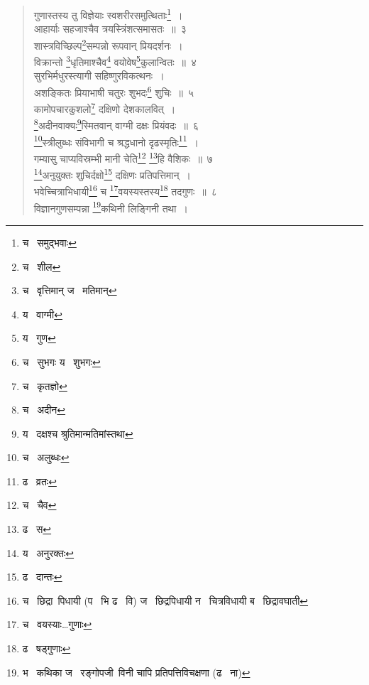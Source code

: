 \documentclass[11pt, openany]{book}
\begin{document}
\begin{quote}
{\na गुणास्तस्य तु विज्ञेयाः स्वशरीरसमुत्थिताः\renewcommand{\thefootnote}{1}\footnote{च \textendash\  समुद्भवाः}~।\\
आहार्याः सहजाश्चैव त्रयस्त्रिंशत्समासतः~॥~३\\
शास्त्रविच्छिल्प\renewcommand{\thefootnote}{2}\footnote{च \textendash\  शील}सम्पन्नो रूपवान् प्रियदर्शनः~।\\
विक्रान्तो \renewcommand{\thefootnote}{3}\footnote{च \textendash\  वृत्तिमान् ज \textendash\  मतिमान्}धृतिमाश्चैव\renewcommand{\thefootnote}{4}\footnote{य \textendash\  वाग्मी} वयोवेष\renewcommand{\thefootnote}{5}\footnote{य \textendash\  गुण}कुलान्वितः~॥~४\\
सुरभिर्मधुरस्त्यागी सहिष्णुरविकत्थनः~।\\
अशङ्कितः प्रियाभाषी चतुरः शुभदः\renewcommand{\thefootnote}{6}\footnote{च \textendash\  सुभगः य \textendash\  शुभगः} शुचिः~॥~५\\
कामोपचारकुशलो\renewcommand{\thefootnote}{7}\footnote{च \textendash\  कृतज्ञो} दक्षिणो देशकालवित्~।\\
\renewcommand{\thefootnote}{8}\footnote{च \textendash\  अदीन}अदीनवाक्यः\renewcommand{\thefootnote}{9}\footnote{य \textendash\  दक्षश्च श्रुतिमान्मतिमांस्तथा}स्मितवान् वाग्मी दक्षः प्रियंवदः~॥~६\\
\renewcommand{\thefootnote}{10}\footnote{च \textendash\  अलुब्धः}स्त्रीलुब्धः संविभागी च श्रद्धधानो दृढस्मृतिः\renewcommand{\thefootnote}{11}\footnote{ढ \textendash\  व्रतः}~।\\
गम्यासु चाप्यविस्रम्भी मानी चेति\renewcommand{\thefootnote}{12}\footnote{च \textendash\  चैव} \renewcommand{\thefootnote}{13}\footnote{ढ \textendash\  स}हि वैशिकः~॥~७\\
\renewcommand{\thefootnote}{14}\footnote{य \textendash\  अनुरक्तः}अनुयुक्तः शुचिर्दक्षो\renewcommand{\thefootnote}{15}\footnote{ढ \textendash\  दान्तः} दक्षिणः प्रतिपत्तिमान्~।\\
भवेच्चित्राभिधायी\renewcommand{\thefootnote}{16}\footnote{च \textendash\  छिद्रा\textendash\ पिधायी (प \textendash\  भि ढ \textendash\  वि) ज \textendash\  छिद्रपिधायी न \textendash\  चित्रविधायी ब \textendash\  छिद्रावघाती} च \renewcommand{\thefootnote}{17}\footnote{च \textendash\  वयस्याः\ldots गुणाः}वयस्यस्तस्य\renewcommand{\thefootnote}{18}\footnote{ढ \textendash\  षड्गुणाः} तदगुणः~॥~८\\
विज्ञानगुणसम्पन्ना \renewcommand{\thefootnote}{19}\footnote{भ \textendash\  कथिका ज \textendash\  रङ्गोपजी\textendash\ विनी चापि प्रतिपत्तिविचक्षणा (ढ \textendash\  ना)}कथिनी लिङ्गिनी तथा~।}
\end{quote}
\end{document}
